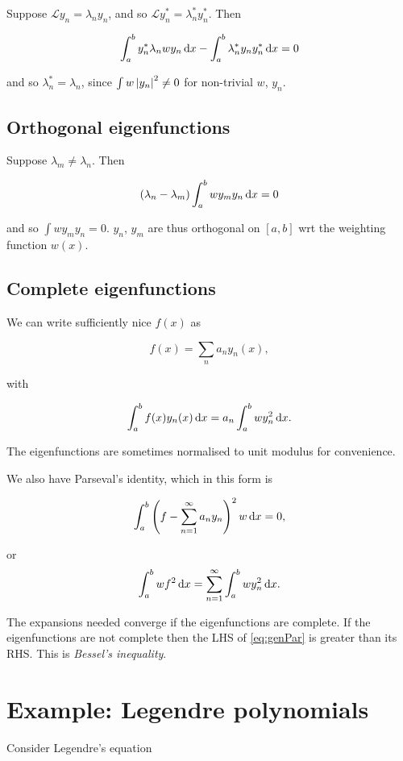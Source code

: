 \documentclass{notes}
\theoremstyle{plain}
\newcommand{\cL}{\mathcal{L}}
\begin{document}
Suppose $\cL y_n = \lambda_n y_n$, and so $\cL y_n^* = \lambda_n^*
y_n^*$.  Then

\[
\int_a^b y_n^* \lambda_n w y_n\, \mathrm{d} x - \int_a^b \lambda_n^* y_n
y_n^*\, \mathrm{d} x = 0
\]

and so $\lambda_n^* = \lambda_n$, since $\int w \left|y_n\right|^2 \neq 0$
for non-trivial $w$, $y_n$.

\subsection{Orthogonal eigenfunctions}

Suppose $\lambda_m \neq \lambda_n$.  Then

\[
\left( \lambda_n - \lambda_m \right) \int_a^b w y_m y_n\, \mathrm{d} x = 0
\]

and so $\int w y_m y_n = 0$.  $y_n$, $y_m$ are thus orthogonal on
$[a,b]$ wrt the weighting function $w(x)$.

\subsection{Complete eigenfunctions}

We can write sufficiently nice $f(x)$ as 

\[
f(x) = \sum_n a_n y_n(x),
\]

with

\[
\int_a^b f(x) y_n(x)\, \mathrm{d} x = a_n \int_a^b w y_n^2\, \mathrm{d} x.
\]

The eigenfunctions are sometimes normalised to unit modulus for convenience.

We also have Parseval's identity, which in this form is

\[
\int_a^b \left( f - \sum_{n=1}^\infty a_n y_n \right)^2 w\, \mathrm{d} x = 0,
\]

or
\begin{equation}\label{eq:genPar}
\int_a^b w f^2\, \mathrm{d} x = \sum_{n=1}^\infty \int_a^b w y_n^2\,\mathrm{d} x.
\end{equation}

The expansions needed converge if the eigenfunctions are complete.  If
the eigenfunctions are not complete then the LHS of \eqref{eq:genPar}
is greater than its RHS.  This is \emph{Bessel's inequality}.

\section{Example: Legendre polynomials}

Consider Legendre's equation
\end{document}
